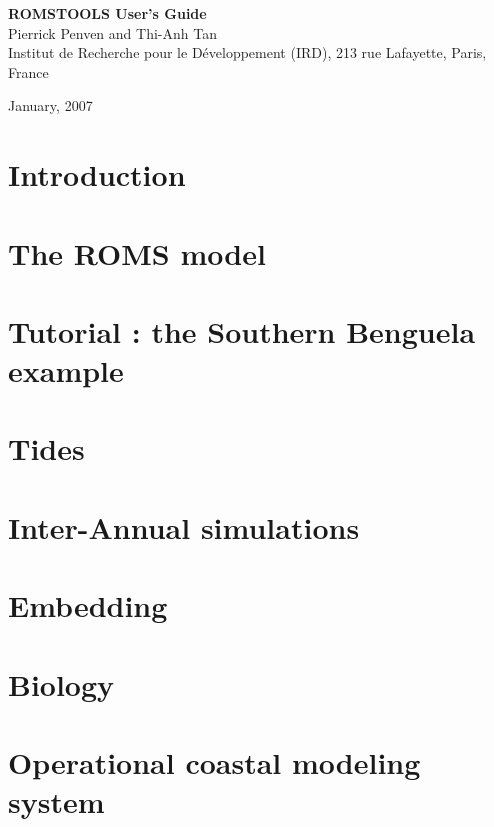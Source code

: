 \documentclass[10pt]{article}
\begin{document}
\setcounter{page}{0}
\pagestyle{empty}
\begin{center}
\vspace{3 cm}
{\huge \bf ROMSTOOLS User's Guide }\\
\vspace{2 cm}
{\Large Pierrick Penven and Thi-Anh Tan}\\ 
\vspace{1 cm}
{\large Institut de Recherche pour le D\'eveloppement (IRD),
213 rue Lafayette, Paris,
France} \\
\vspace{2cm}
\centerline{}
\vspace{1cm}

{January, 2007}


\end{center}

\pagebreak
\setcounter{page}{0}
\tableofcontents
\pagebreak
\pagestyle{plain}

\section{Introduction}


\section{The ROMS model}


\section{Tutorial : the Southern Benguela example}


\section{Tides}


\section{Inter-Annual simulations}


\section{Embedding}


\section{Biology}


\section{Operational coastal modeling system}


\pagebreak
\begin{thebibliography}{}

\end{thebibliography}
\end{document}
